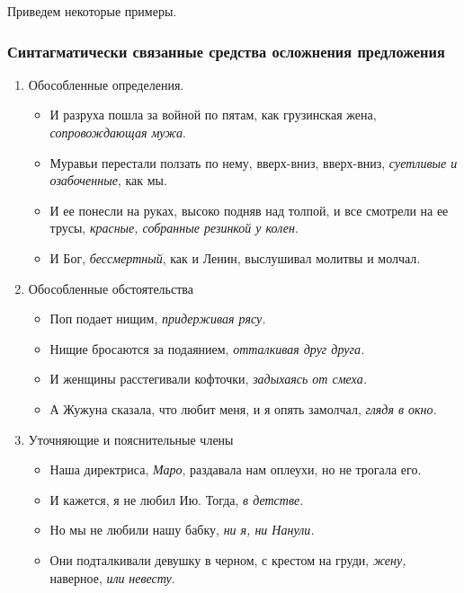 \documentclass{kursa4}
\begin{document}
{{        Приведем некоторые примеры.

        \subsubsection{Синтагматически связанные средства осложнения предложения}

          \begin{enumerate}
            \item Обособленные определения.
            \begin{itemize}
              \item И разруха пошла за войной по пятам, как грузинская жена, \textit{сопровождающая мужа}.
              \item Муравьи перестали ползать по нему, вверх-вниз, вверх-вниз, \textit{суетливые и озабоченные}, как мы.
              \item И ее понесли на руках, высоко подняв над толпой,
              и все смотрели на ее трусы, \textit{красные,
              собранные резинкой у колен}.
              \item И Бог, \textit{бессмертный}, как и Ленин, выслушивал молитвы и молчал.
            \end{itemize}

            \item Обособленные обстоятельства
            \begin{itemize}
              \item Поп подает нищим, \textit{придерживая рясу.}
              \item Нищие бросаются за подаянием, \textit{отталкивая друг друга.}
              \item И женщины расстегивали кофточки, \textit{задыхаясь от смеха.}
              \item А Жужуна сказала, что любит меня, и я опять замолчал,\textit{
              глядя в окно.}
            \end{itemize}

            \item Уточняющие и пояснительные члены
            \begin{itemize}
              \item Наша директриса, \textit{Маро}, раздавала нам оплеухи, но не
              трогала его.
              \item И кажется, я не любил Ию. Тогда, \textit{в детстве}.
              \item Но мы не любили нашу бабку, \textit{ни я, ни Нанули.}
              \item Они подталкивали девушку в черном, с крестом на груди, \textit{жену,} наверное, \textit{или} \textit{невесту}.
            \end{itemize}
        

\end{enumerate}}}
\end{document}
